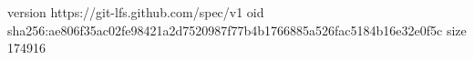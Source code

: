 version https://git-lfs.github.com/spec/v1
oid sha256:ae806f35ac02fe98421a2d7520987f77b4b1766885a526fac5184b16e32e0f5c
size 174916
